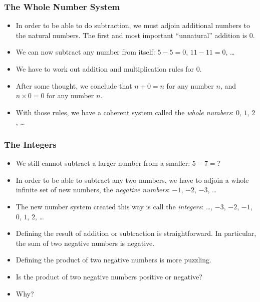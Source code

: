 \documentclass[serif,ignorenonframetext]{beamer}
\begin{document}
\begin{frame}
  \frametitle{The Whole Number System}
  \begin{itemize}[<+->]
  \item In order to be able to do subtraction, we must adjoin additional
    numbers to the natural numbers.  The first and most important 
    ``unnatural'' addition is $0$.
  \item We can now subtract any number from itself: $5-5=0$, $11-11=0$, \ldots
  \item We have to work out addition and multiplication rules for $0$.
  \item After some thought, we conclude that $n+0=n$ for any number $n$,
    and $n\times 0 = 0$ for any number $n$.
  \item With those rules, we have a coherent system called the 
    \textit{whole numbers}: $0$, $1$, $2$, \ldots
  \end{itemize}
\end{frame}

\begin{frame}
  \frametitle{The Integers}
  \begin{itemize}[<+->]
  \item We still cannot subtract a larger number from a smaller: $5-7=$?
  \item In order to be able to subtract any two numbers, we have to adjoin
    a whole infinite set of new numbers, the \textit{negative numbers}: 
    $-1$, $-2$, $-3$, \ldots
  \item The new number system created this way is call the \textit{integers}:
    \ldots, $-3$, $-2$, $-1$, $0$, $1$, $2$, \ldots
  \item Defining the result of addition or subtraction is straightforward.
    In particular, the sum of two negative numbers is negative.
  \item Defining the product of two negative numbers is more puzzling.
  \item Is the product of two negative numbers positive or negative?
  \item Why?
  \end{itemize}
\end{frame}
\end{document}
